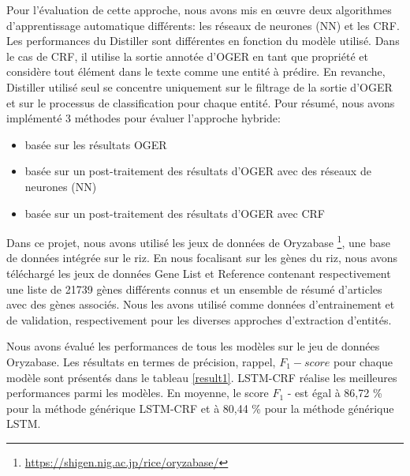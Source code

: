 Pour l'évaluation de cette approche, nous avons mis en œuvre deux algorithmes d’apprentissage automatique différents: les réseaux de neurones (NN) et les CRF. Les performances du Distiller sont différentes en fonction du modèle utilisé. Dans le cas de CRF, il utilise la sortie annotée d'OGER en tant que propriété et considère tout élément dans le texte comme une entité à prédire. En revanche, Distiller utilisé seul se concentre uniquement sur le filtrage de la sortie d'OGER et sur le processus de classification pour chaque entité. Pour résumé, nous avons implémenté 3 méthodes pour évaluer l'approche hybride: \\
\begin{itemize}
\item basée sur les résultats OGER
\item basée sur un post-traitement des résultats d'OGER avec des réseaux de neurones (NN) 
\item basée sur un post-traitement des résultats d'OGER avec CRF\\
\end{itemize}


Dans ce projet, nous avons utilisé les jeux de données de Oryzabase \footnote {\url{https://shigen.nig.ac.jp/rice/oryzabase/}}, une base de données intégrée sur le riz. En nous focalisant sur les gènes du riz, nous avons téléchargé les jeux de données Gene List et Reference contenant respectivement une liste de 21739 gènes différents connus et un ensemble de résumé d'articles avec des gènes associés. Nous les avons utilisé comme données d'entrainement et de validation, respectivement pour les diverses approches d'extraction d'entités.

Nous avons évalué les performances de tous les modèles sur le jeu de données Oryzabase. Les résultats en termes de précision, rappel, $ F_ {1} -score $ pour chaque modèle sont présentés dans le tableau \ref{result1}. LSTM-CRF réalise les meilleures performances parmi les modèles. En moyenne, le score $ F_ {1} $ - est égal à 86,72 \% pour la méthode générique LSTM-CRF et à 80,44 \% pour la méthode générique LSTM.

